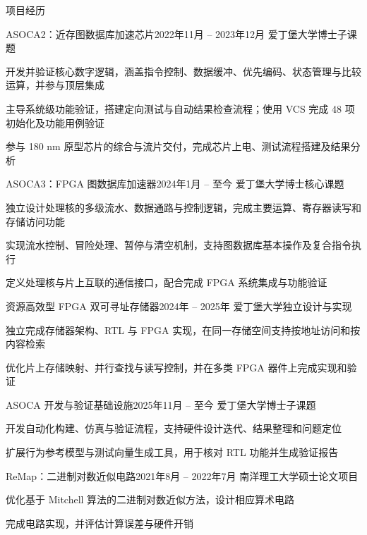 \documentclass{resume}
\begin{document}
\begin{rSection}{项目经历}
  \begin{rSubsection}{ASOCA2：近存图数据库加速芯片}{2022年11月 -- 2023年12月}
    {爱丁堡大学}{博士子课题}
    \item 开发并验证核心数字逻辑，涵盖指令控制、数据缓冲、优先编码、状态管理与比较运算，并参与顶层集成
    \item 主导系统级功能验证，搭建定向测试与自动结果检查流程；使用 VCS 完成 48 项初始化及功能用例验证
    \item 参与 180 nm 原型芯片的综合与流片交付，完成芯片上电、测试流程搭建及结果分析
  \end{rSubsection}

  \begin{rSubsection}{ASOCA3：FPGA 图数据库加速器}{2024年1月 -- 至今}
    {爱丁堡大学}{博士核心课题}
    \item 独立设计处理核的多级流水、数据通路与控制逻辑，完成主要运算、寄存器读写和存储访问功能
    \item 实现流水控制、冒险处理、暂停与清空机制，支持图数据库基本操作及复合指令执行
    \item 定义处理核与片上互联的通信接口，配合完成 FPGA 系统集成与功能验证
  \end{rSubsection}

  \begin{rSubsection}{资源高效型 FPGA 双可寻址存储器}{2024年 -- 2025年}
    {爱丁堡大学}{独立设计与实现}
    \item 独立完成存储器架构、RTL 与 FPGA 实现，在同一存储空间支持按地址访问和按内容检索
    \item 优化片上存储映射、并行查找与读写控制，并在多类 FPGA 器件上完成实现和验证
  \end{rSubsection}

  \begin{rSubsection}{ASOCA 开发与验证基础设施}{2025年11月 -- 至今}
    {爱丁堡大学}{博士子课题}
    \item 开发自动化构建、仿真与验证流程，支持硬件设计迭代、结果整理和问题定位
    \item 扩展行为参考模型与测试向量生成工具，用于核对 RTL 功能并生成验证报告
  \end{rSubsection}

  \begin{rSubsection}{ReMap：二进制对数近似电路}{2021年8月 -- 2022年7月}
    {南洋理工大学}{硕士论文项目}
    \item 优化基于 Mitchell 算法的二进制对数近似方法，设计相应算术电路
    \item 完成电路实现，并评估计算误差与硬件开销
  \end{rSubsection}


\end{rSection}
\end{document}
